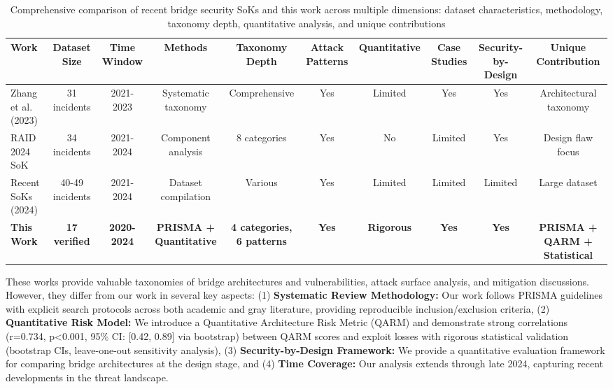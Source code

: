 \documentclass[runningheads]{llncs}
\begin{document}
\begin{table}[!ht]
    \centering
    \scriptsize
    \caption{Comprehensive comparison of recent bridge security SoKs and this work across multiple dimensions: dataset characteristics, methodology, taxonomy depth, quantitative analysis, and unique contributions}
    \label{tab:sok_comparison}
    \begin{tabular}{lccccccccc}
        \toprule
        \textbf{Work} & \textbf{Dataset Size} & \textbf{Time Window} & \textbf{Methods} & \textbf{Taxonomy Depth} & \textbf{Attack Patterns} & \textbf{Quantitative} & \textbf{Case Studies} & \textbf{Security-by-Design} & \textbf{Unique Contribution} \\
        \midrule
        Zhang et al. (2023) & 31 incidents & 2021-2023 & Systematic taxonomy & Comprehensive & Yes & Limited & Yes & Yes & Architectural taxonomy \\
        RAID 2024 SoK & 34 incidents & 2021-2024 & Component analysis & 8 categories & Yes & No & Limited & Yes & Design flaw focus \\
        Recent SoKs (2024) & 40-49 incidents & 2021-2024 & Dataset compilation & Various & Yes & Limited & Limited & Limited & Large dataset \\
        \midrule
        \textbf{This Work} & \textbf{17 verified} & \textbf{2020-2024} & \textbf{PRISMA + Quantitative} & \textbf{4 categories, 6 patterns} & \textbf{Yes} & \textbf{Rigorous} & \textbf{Yes} & \textbf{Yes} & \textbf{PRISMA + QARM + Statistical} \\
        \bottomrule
    \end{tabular}
\end{table}

These works provide valuable taxonomies of bridge architectures and vulnerabilities, attack surface analysis, and mitigation discussions. However, they differ from our work in several key aspects: (1) \textbf{Systematic Review Methodology:} Our work follows PRISMA guidelines with explicit search protocols across both academic and gray literature, providing reproducible inclusion/exclusion criteria, (2) \textbf{Quantitative Risk Model:} We introduce a Quantitative Architecture Risk Metric (QARM) and demonstrate strong correlations (r=0.734, p<0.001, 95\% CI: [0.42, 0.89] via bootstrap) between QARM scores and exploit losses with rigorous statistical validation (bootstrap CIs, leave-one-out sensitivity analysis), (3) \textbf{Security-by-Design Framework:} We provide a quantitative evaluation framework for comparing bridge architectures at the design stage, and (4) \textbf{Time Coverage:} Our analysis extends through late 2024, capturing recent developments in the threat landscape.
\end{document}
